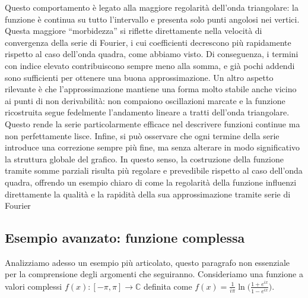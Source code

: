 \documentclass[a4paper,12pt]{report}
\begin{document}
Questo comportamento è legato alla maggiore regolarità dell’onda triangolare: la funzione è continua su tutto l’intervallo e presenta solo punti angolosi nei vertici. Questa maggiore “morbidezza” si riflette direttamente nella velocità di convergenza della serie di Fourier, i cui coefficienti decrescono più rapidamente rispetto al caso dell’onda quadra, come abbiamo visto. Di conseguenza, i termini con indice elevato contribuiscono sempre meno alla somma, e già pochi addendi sono sufficienti per ottenere una buona approssimazione. Un altro aspetto rilevante è che l’approssimazione mantiene una forma molto stabile anche vicino ai punti di non derivabilità: non compaiono oscillazioni marcate e la funzione ricostruita segue fedelmente l’andamento lineare a tratti dell’onda triangolare. Questo rende la serie particolarmente efficace nel descrivere funzioni continue ma non perfettamente lisce. Infine, si può osservare che ogni termine della serie introduce una correzione sempre più fine, ma senza alterare in modo significativo la struttura globale del grafico. In questo senso, la costruzione della funzione tramite somme parziali risulta più regolare e prevedibile rispetto al caso dell’onda quadra, offrendo un esempio chiaro di come la regolarità della funzione influenzi direttamente la qualità e la rapidità della sua approssimazione tramite serie di Fourier

\newpage
    
\subsection{Esempio avanzato: funzione complessa}    
        
Analizziamo adesso un esempio più articolato, questo paragrafo non essenziale per la comprensione degli argomenti che seguiranno. Consideriamo una funzione a valori complessi $f(x):[-\pi,\pi]\to \mathbb{C}$ definita come $f(x)=\displaystyle\frac{1}{i\pi}\ln \bigg(\frac{1+e^{ix}}{1-e^{ix}}\bigg)$. 
\end{document}
